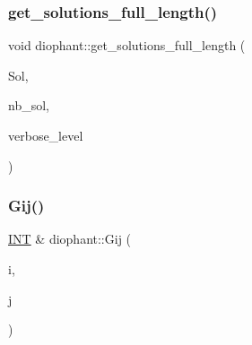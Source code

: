 \mbox{\label{classdiophant_ad42d491423a6f098ed998167c99683f4}} 
\subsubsection{\texorpdfstring{get\+\_\+solutions\+\_\+full\+\_\+length()}{get\_solutions\_full\_length()}}
{\footnotesize\ttfamily void diophant\+::get\+\_\+solutions\+\_\+full\+\_\+length (\begin{DoxyParamCaption}\item[{\mbox{\hyperlink{galois_8h_a09fddde158a3a20bd2dcadb609de11dc}{I\+NT}} $\ast$\&}]{Sol,  }\item[{\mbox{\hyperlink{galois_8h_a09fddde158a3a20bd2dcadb609de11dc}{I\+NT}} \&}]{nb\+\_\+sol,  }\item[{\mbox{\hyperlink{galois_8h_a09fddde158a3a20bd2dcadb609de11dc}{I\+NT}}}]{verbose\+\_\+level }\end{DoxyParamCaption})}

\mbox{\label{classdiophant_a4d6f0cda44ebcbbf242e850ae6f6e611}} 
\subsubsection{\texorpdfstring{Gij()}{Gij()}}
{\footnotesize\ttfamily \mbox{\hyperlink{galois_8h_a09fddde158a3a20bd2dcadb609de11dc}{I\+NT}} \& diophant\+::\+Gij (\begin{DoxyParamCaption}\item[{\mbox{\hyperlink{galois_8h_a09fddde158a3a20bd2dcadb609de11dc}{I\+NT}}}]{i,  }\item[{\mbox{\hyperlink{galois_8h_a09fddde158a3a20bd2dcadb609de11dc}{I\+NT}}}]{j }\end{DoxyParamCaption})}

\mbox{\label{classdiophant_ac84b2692cc489bb7f8c8270532887ac0}} 
